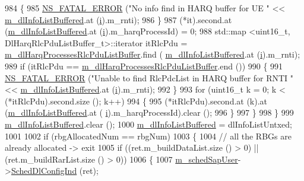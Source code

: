 \begin{DoxyCode}
984             \{
985               \hyperlink{group__fatal_ga5131d5e3f75d7d4cbfd706ac456fdc85}{NS\_FATAL\_ERROR} (\textcolor{stringliteral}{"No info find in HARQ buffer for UE "} << 
      \hyperlink{classns3_1_1TdMtFfMacScheduler_a4237ad4223d377a1c9963a904acbe4ad}{m\_dlInfoListBuffered}.at (\hyperlink{bernuolliDistribution_8m_a6f6ccfcf58b31cb6412107d9d5281426}{i}).m\_rnti);
986             \}
987           (*it).second.at (\hyperlink{classns3_1_1TdMtFfMacScheduler_a4237ad4223d377a1c9963a904acbe4ad}{m\_dlInfoListBuffered}.at (\hyperlink{bernuolliDistribution_8m_a6f6ccfcf58b31cb6412107d9d5281426}{i}).m\_harqProcessId) = 0;
988           std::map <uint16\_t, DlHarqRlcPduListBuffer\_t>::iterator itRlcPdu =  
      \hyperlink{classns3_1_1TdMtFfMacScheduler_a5c8ba74976d19c98462ea970613b644b}{m\_dlHarqProcessesRlcPduListBuffer}.find (
      \hyperlink{classns3_1_1TdMtFfMacScheduler_a4237ad4223d377a1c9963a904acbe4ad}{m\_dlInfoListBuffered}.at (\hyperlink{bernuolliDistribution_8m_a6f6ccfcf58b31cb6412107d9d5281426}{i}).m\_rnti);
989           \textcolor{keywordflow}{if} (itRlcPdu == \hyperlink{classns3_1_1TdMtFfMacScheduler_a5c8ba74976d19c98462ea970613b644b}{m\_dlHarqProcessesRlcPduListBuffer}.end ())
990             \{
991               \hyperlink{group__fatal_ga5131d5e3f75d7d4cbfd706ac456fdc85}{NS\_FATAL\_ERROR} (\textcolor{stringliteral}{"Unable to find RlcPdcList in HARQ buffer for RNTI "} << 
      \hyperlink{classns3_1_1TdMtFfMacScheduler_a4237ad4223d377a1c9963a904acbe4ad}{m\_dlInfoListBuffered}.at (\hyperlink{bernuolliDistribution_8m_a6f6ccfcf58b31cb6412107d9d5281426}{i}).m\_rnti);
992             \}
993           \textcolor{keywordflow}{for} (uint16\_t k = 0; k < (*itRlcPdu).second.size (); k++)
994             \{
995               (*itRlcPdu).second.at (k).at (\hyperlink{classns3_1_1TdMtFfMacScheduler_a4237ad4223d377a1c9963a904acbe4ad}{m\_dlInfoListBuffered}.at (
      \hyperlink{bernuolliDistribution_8m_a6f6ccfcf58b31cb6412107d9d5281426}{i}).m\_harqProcessId).clear ();
996             \}
997         \}
998     \}
999   \hyperlink{classns3_1_1TdMtFfMacScheduler_a4237ad4223d377a1c9963a904acbe4ad}{m\_dlInfoListBuffered}.clear ();
1000   \hyperlink{classns3_1_1TdMtFfMacScheduler_a4237ad4223d377a1c9963a904acbe4ad}{m\_dlInfoListBuffered} = dlInfoListUntxed;
1001 
1002   \textcolor{keywordflow}{if} (rbgAllocatedNum == rbgNum)
1003     \{
1004       \textcolor{comment}{// all the RBGs are already allocated -> exit}
1005       \textcolor{keywordflow}{if} ((ret.m\_buildDataList.size () > 0) || (ret.m\_buildRarList.size () > 0))
1006         \{
1007           \hyperlink{classns3_1_1TdMtFfMacScheduler_a2e3ce0452adef9b30cce73ac31c93ef4}{m\_schedSapUser}->\hyperlink{classns3_1_1FfMacSchedSapUser_a28f8484af5a32a45ee6c0e51770d83f7}{SchedDlConfigInd} (ret);

\end{DoxyCode}
